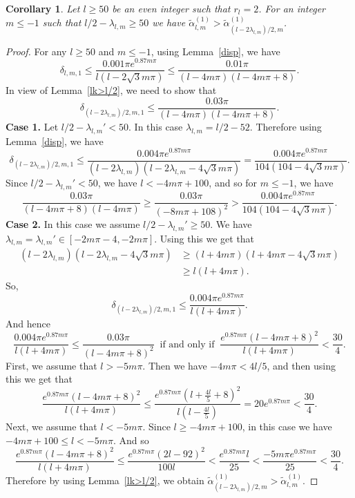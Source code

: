 \documentclass[12pt,reqno]{amsart}
\newtheorem{cor}{Corollary}
\newcommand{\lemref}[1]{Lemma~\ref{#1}}
\begin{document}
\begin{cor}\label{ck>l/2}
Let $l\ge50$ be an even integer such that $r_l=2$. For an integer $m\le-1$ such that $l/2-\lambda_{l,m}\ge 50$ we have
$\tilde\alpha_{l,m}^{(1)}>\tilde\alpha_{(l-2\lambda_{l,m})/2,m}^{(1)}$.
\end{cor}
\begin{proof} For any $l\ge 50$ and $m\le-1$, using \lemref{disp}, we have
\begin{equation}\label{4l/5}
\delta_{l,m,1}\le\frac{0.001\pi e^{0.87m\pi}}{l(l-2\sqrt3m\pi)}\le \frac{0.01\pi}{(l-4m\pi)(l-4m\pi+8)}.
\end{equation}
In view of \lemref{lk>l/2}, we need to show that
$$
 \delta_{(l-2\lambda_{l,m})/2,m,1}\le  \frac{0.03\pi}{(l-4m\pi)(l-4m\pi+8)}.
$$
{\bf Case 1.} Let $l/2-\lambda_{l,m}'< 50$. In this case $\lambda_{l,m}=l/2-52$.
     Therefore using \lemref{disp}, we have
 $$
    \delta_{(l-2\lambda_{l,m})/2,m,1}\le \frac{0.004\pi e^{0.87m\pi}}{(l-2\lambda_{l,m})(l-2\lambda_{l,m}-4\sqrt3 m\pi)}=\frac{0.004\pi e^{0.87m\pi}}{104(104-4\sqrt3 m\pi)}.
    $$
       Since $l/2-\lambda_{l,m}'<50$, we have $l<-4m\pi+100$, and so for $m\le-1$, we have 
    $$
  \frac{0.03\pi}{(l-4m\pi+8)(l-4m\pi)}\ge \frac{0.03\pi}{(-8m\pi+108)^2}>
  \frac{0.004\pi e^{0.87m\pi}}{104(104-4\sqrt3 m\pi)}.
    $$
{\bf Case 2.}
In this case we assume $l/2-\lambda_{l,m}'\ge50$. We have
 $ \lambda_{l,m}=\lambda_{l,m}'\in[-2m\pi-4,-2m\pi]$. Using this we get that
\begin{align*}
 (l-2\lambda_{l,m})(l-2\lambda_{l,m}-4\sqrt3 m\pi)&\ge (l+4m\pi)(l+4m\pi-4\sqrt3m\pi)\\&\ge l(l+4m\pi).
\end{align*}
So,
 $$
  \delta_{(l-2\lambda_{l,m})/2,m,1}\le \frac{0.004\pi e^{0.87m\pi}}{l(l+4m\pi)}.
 $$
And hence
 $$
 \frac{0.004\pi e^{0.87m\pi}}{l(l+4m\pi)}\le \frac{0.03\pi}{(l-4m\pi+8)^2} \ \text{ if and only if }\ \frac{e^{0.87m\pi}(l-4m\pi+8)^2}{l(l+4m\pi)}<\frac{30}{4}.
 $$
 First, we assume that $l>-5m\pi$. Then we have $-4m\pi<4l/5$, and then using this we get that
 $$
 \frac{e^{0.87m\pi}(l-4m\pi+8)^2}{l(l+4m\pi)}\le \frac{e^{0.87m\pi}(l+\frac{4l}{5}+8)^2}{l(l-\frac{4l}{5})}={20e^{0.87m\pi}}<\frac{30}{4}.
 $$
Next, we assume that $l<-5m\pi$. Since $l\ge-4m\pi+100$, in this case we have $-4m\pi+100\le l<-5m\pi$. And so
$$
\frac{e^{0.87m\pi}(l-4m\pi+8)^2}{l(l+4m\pi)}\le \frac{e^{0.87m\pi}(2l-92)^2}{100l}<\frac{e^{0.87m\pi}l}{25}<\frac{-5m\pi e^{0.87m\pi}}{25}<\frac{30}{4}.
$$
  Therefore by using \lemref{lk>l/2}, we obtain $\tilde\alpha_{(l-2\lambda_{l,m})/2,m}^{(1)}>\tilde\alpha_{l,m}^{(1)}$.



\end{proof}
\end{document}
